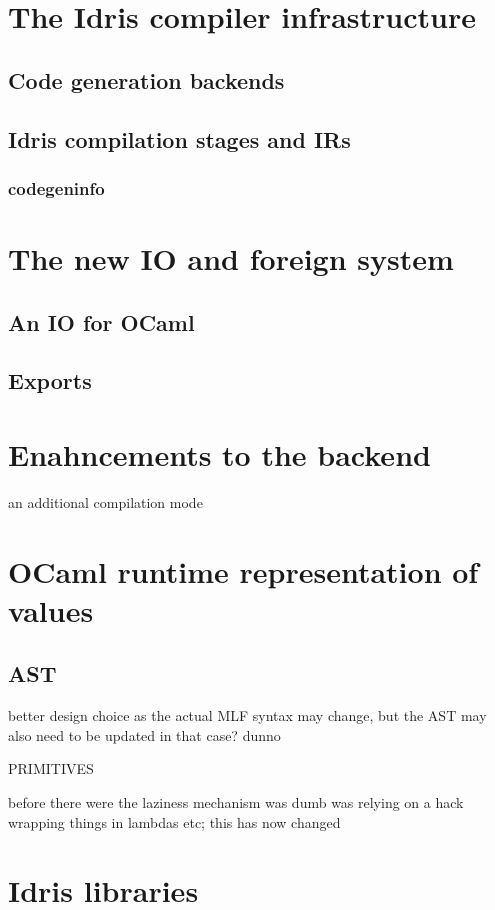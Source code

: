 \section{The Idris compiler infrastructure}
\subsection{Code generation backends}

\subsection{Idris compilation stages and IRs}
\subsubsection{codegeninfo}

\section{The new IO and foreign system}
\subsection{An IO for OCaml}

\subsection{Exports}

\section{Enahncements to the backend} 
an additional compilation mode

\section{OCaml runtime representation of values}

\subsection{AST} 
better design choice as the actual MLF syntax may change,
but the AST may also need to be updated in that case? dunno

PRIMITIVES 



before there were the laziness mechanism was dumb was relying
on a hack wrapping things in lambdas etc; this has now changed
\section{Idris libraries}

